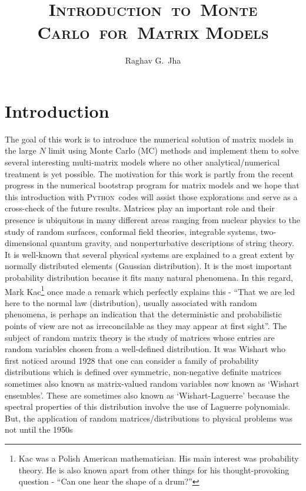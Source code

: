 \documentclass[letter,11pt]{article}
\title{\textsc{\LARGE{Introduction}~\large{to}~\LARGE{Monte Carlo}~\large{for}~\LARGE{Matrix Models}}}
\author{\large{Raghav G.~Jha}}
\affiliation{Perimeter Institute for Theoretical Physics, Waterloo, Ontario N2L 2Y5, Canada\\}
\newcommand{\PY}{\textsc{Python}}
\begin{document}
\date{}
\maketitle

\section{Introduction}
The goal of this work is to introduce the numerical solution of matrix models in the large $N$ limit using Monte Carlo (MC) methods and implement them to solve several 
interesting multi-matrix models where no other analytical/numerical treatment is yet possible. The motivation for this work is partly from the recent progress in the numerical bootstrap program for matrix models and we hope that this introduction with \PY~codes will assist those explorations and serve as a cross-check of the future results. Matrices play an important role and their presence is ubiquitous in many different areas ranging from nuclear physics to the study of random surfaces, conformal field theories, integrable systems, two-dimensional quantum gravity, and nonperturbative descriptions of string theory. It is well-known that several physical systems are explained to a great extent by normally distributed elements (Gaussian distribution). It is the most important probability 
distribution because it fits many natural phenomena. In this regard, Mark Kac\footnote{Kac was a Polish American mathematician. His main interest was probability theory. He is also known apart from other things for his thought-provoking question - ``Can one hear 
the shape of a drum?''} once made a remark which perfectly explains this - ``That we are led here to the normal law (distribution), usually associated with random phenomena, is perhaps
an indication that the deterministic and probabilistic points of view are not as irreconcilable as they may appear at first sight''. 
The subject of random matrix theory is the study of matrices whose entries are random variables chosen from a well-defined distribution. 
It was Wishart who first noticed around 1928 that one can consider a family of 
probability distributions which is defined over symmetric, non-negative definite 
matrices sometimes also known as matrix-valued random variables 
now known as `Wishart ensembles'. These are sometimes also known 
as `Wishart-Laguerre' because the spectral properties of this distribution 
involve the use of Laguerre polynomials. But, the application of random matrices/distributions
to physical problems was not until the 1950s
\end{document}
